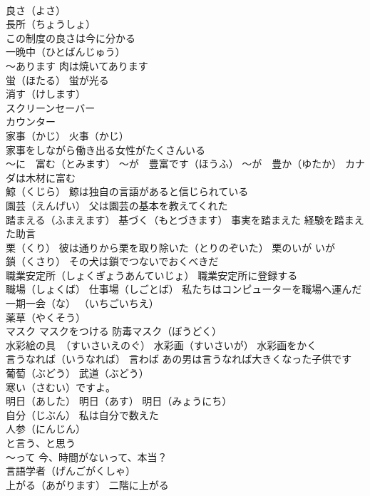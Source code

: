 \documentclass[8pt]{extreport}
\begin{document}
\begin{CJK}{UTF8}{min}
\\	良さ（よさ） 
\\	長所（ちょうしょ）
\\	この制度の良さは今に分かる
\\	一晩中（ひとばんじゅう）
\\	～あります 肉は焼いてあります
\\	蛍（ほたる） 蛍が光る
\\	消す（けします）
\\	スクリーンセーバー
\\	カウンター 
\\	家事（かじ） 火事（かじ）
\\	家事をしながら働き出る女性がたくさんいる
\\	～に　富む（とみます） ～が　豊富です（ほうふ） ～が　豊か（ゆたか） カナダは木材に富む
\\	鯨（くじら） 鯨は独自の言語があると信じられている
\\	園芸（えんげい） 父は園芸の基本を教えてくれた
\\	踏まえる（ふまえます） 基づく（もとづきます） 事実を踏まえた 経験を踏まえた助言
\\	栗（くり） 彼は通りから栗を取り除いた（とりのぞいた） 栗のいが いが 
\\	鎖（くさり） その犬は鎖でつないでおくべきだ
\\	職業安定所（しょくぎょうあんていじょ） 職業安定所に登録する
\\	職場（しょくば） 仕事場（しごとば） 私たちはコンピューターを職場へ運んだ
\\	一期一会（な） （いちごいちえ）
\\	薬草（やくそう）
\\	マスク マスクをつける 防毒マスク（ぼうどく）
\\	水彩絵の具　（すいさいえのぐ） 水彩画（すいさいが） 水彩画をかく
\\	言うなれば（いうなれば） 言わば あの男は言うなれば大きくなった子供です
\\	葡萄（ぶどう） 武道（ぶどう） 
\\	寒い（さむい）ですよ。
\\	明日（あした） 明日（あす） 明日（みょうにち）
\\	自分（じぶん） 私は自分で数えた
\\	人参（にんじん）
\\	と言う、と思う 
\\	～って 今、時間がないって、本当？
\\	言語学者（げんごがくしゃ）
\\	上がる（あがります） 二階に上がる

\end{CJK}
\end{document}
